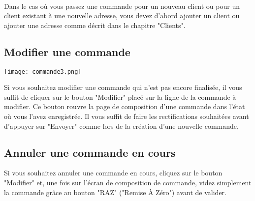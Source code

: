 \paragraph{}
Dans le cas où vous passez une commande pour un nouveau client ou pour un client
existant à une nouvelle adresse, vous devez d'abord ajouter un client ou ajouter
une adresse comme décrit dans le chapitre "Clients".

\subsection{Modifier une commande}

\texttt{[image: commande3.png]}

Si vous souhaitez modifier une commande qui n'est pas encore finalisée, il
vous suffit de cliquer sur le bouton "Modifier" placé sur la ligne de la
commande à modifier. Ce bouton rouvre la page de composition d'une commande dans
l'état où vous l'avez enregistrée. Il vous suffit de faire les rectifications
souhaitées avant d'appuyer sur "Envoyer" comme lors de la création d'une
nouvelle commande.

\subsection{Annuler une commande en cours}
Si vous souhaitez annuler une commande en cours, cliquez sur le bouton
"Modifier" et, une fois sur l'écran de composition de commande, videz simplement
la commande grâce au bouton "RAZ" ("Remise À Zéro") avant de valider.
